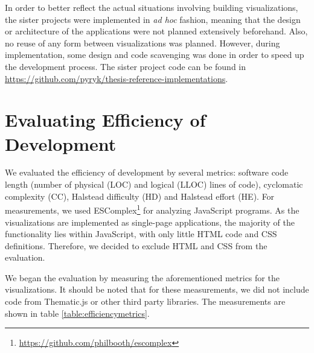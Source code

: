 In order to better reflect the actual situations involving building visualizations, the sister projects were implemented in \emph{ad hoc} fashion, meaning that the design or architecture of the applications were not planned extensively beforehand. Also, no reuse of any form between visualizations was planned. However, during implementation, some design and code scavenging was done in order to speed up the development process. The sister project code can be found in \url{https://github.com/pyryk/thesis-reference-implementations}.

\section{Evaluating Efficiency of Development}
\label{section:evaluatingefficiency}

We evaluated the efficiency of development by several metrics: software code length (number of physical (LOC) and logical (LLOC) lines of code), cyclomatic complexity (CC), Halstead difficulty (HD) and Halstead effort (HE). For measurements, we used ESComplex\footnote{\url{https://github.com/philbooth/escomplex}} for analyzing JavaScript programs. As the visualizations are implemented as single-page applications, the majority of the functionality lies within JavaScript, with only little HTML code and CSS definitions. Therefore, we decided to exclude HTML and CSS from the evaluation.

We began the evaluation by measuring the aforementioned metrics for the visualizations. It should be noted that for these measurements, we did not include code from Thematic.js or other third party libraries. The measurements are shown in table \ref{table:efficiencymetrics}.

